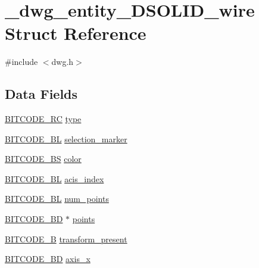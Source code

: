 \hypertarget{struct__dwg__entity__3DSOLID__wire}{\section{\-\_\-dwg\-\_\-entity\-\_\-D\-S\-O\-L\-I\-D\-\_\-wire \-Struct \-Reference}
\label{struct__dwg__entity__3DSOLID__wire}
}


{\ttfamily \#include $<$dwg.\-h$>$}

\subsection*{\-Data \-Fields}
\begin{DoxyCompactItemize}
\item 
\hyperlink{dwg_8h_a7fd199a8f9c9cc52bdab220f65a2a619}{\-B\-I\-T\-C\-O\-D\-E\-\_\-\-R\-C} \hyperlink{struct__dwg__entity__3DSOLID__wire_a136c9dcbfe3e0e9651a60e3be408c78a}{type}
\item 
\hyperlink{dwg_8h_aebd5f127038868cbabc3d55d91da776c}{\-B\-I\-T\-C\-O\-D\-E\-\_\-\-B\-L} \hyperlink{struct__dwg__entity__3DSOLID__wire_a0eb50a258114ddb8b0892874aaef799a}{selection\-\_\-marker}
\item 
\hyperlink{dwg_8h_a94297606fbd4a4ff97e8add284af0809}{\-B\-I\-T\-C\-O\-D\-E\-\_\-\-B\-S} \hyperlink{struct__dwg__entity__3DSOLID__wire_a0e5b05be6bcf678177f628138ee70174}{color}
\item 
\hyperlink{dwg_8h_aebd5f127038868cbabc3d55d91da776c}{\-B\-I\-T\-C\-O\-D\-E\-\_\-\-B\-L} \hyperlink{struct__dwg__entity__3DSOLID__wire_af375b93f8b6fcff99d4caf915689128e}{acis\-\_\-index}
\item 
\hyperlink{dwg_8h_aebd5f127038868cbabc3d55d91da776c}{\-B\-I\-T\-C\-O\-D\-E\-\_\-\-B\-L} \hyperlink{struct__dwg__entity__3DSOLID__wire_a433ce38435a447a07af64d756a1317be}{num\-\_\-points}
\item 
\hyperlink{dwg_8h_a00698ef1bb072aa0a9360c6fc1c57587}{\-B\-I\-T\-C\-O\-D\-E\-\_\-B\-D} $\ast$ \hyperlink{struct__dwg__entity__3DSOLID__wire_a26f7c995b4309bf1e8c89b7c309c985e}{points}
\item 
\hyperlink{dwg_8h_ab533b1f62d9086749e3bb5b67e9f224e}{\-B\-I\-T\-C\-O\-D\-E\-\_\-\-B} \hyperlink{struct__dwg__entity__3DSOLID__wire_ab433fa4045c5998ea98456512cd27ff0}{transform\-\_\-present}
\item 
\hyperlink{dwg_8h_a00698ef1bb072aa0a9360c6fc1c57587}{\-B\-I\-T\-C\-O\-D\-E\-\_\-B\-D} \hyperlink{struct__dwg__entity__3DSOLID__wire_a8d90e58a5cf66e8423e29a7dcfd74949}{axis\-\_\-x}

\end{DoxyCompactItemize}
